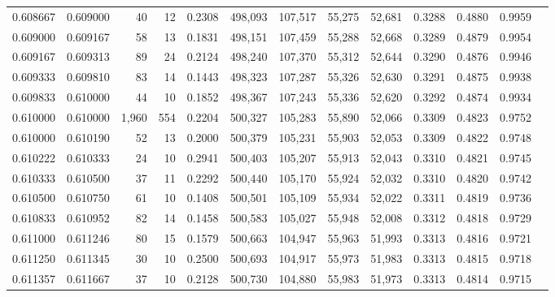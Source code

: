 \begin{tabular}{rrrrrrrrrrrrr}
0.608667 & 0.609000 &    40 &  12 &                                     0.2308 & 498,093 & 107,517 &  55,275 &  52,681 & 0.3288 & 0.4880 & 0.9959 \\
0.609000 & 0.609167 &    58 &  13 &                                     0.1831 & 498,151 & 107,459 &  55,288 &  52,668 & 0.3289 & 0.4879 & 0.9954 \\
0.609167 & 0.609313 &    89 &  24 &                                     0.2124 & 498,240 & 107,370 &  55,312 &  52,644 & 0.3290 & 0.4876 & 0.9946 \\
0.609333 & 0.609810 &    83 &  14 &                                     0.1443 & 498,323 & 107,287 &  55,326 &  52,630 & 0.3291 & 0.4875 & 0.9938 \\
0.609833 & 0.610000 &    44 &  10 &                                     0.1852 & 498,367 & 107,243 &  55,336 &  52,620 & 0.3292 & 0.4874 & 0.9934 \\
0.610000 & 0.610000 & 1,960 & 554 &                                     0.2204 & 500,327 & 105,283 &  55,890 &  52,066 & 0.3309 & 0.4823 & 0.9752 \\
0.610000 & 0.610190 &    52 &  13 &                                     0.2000 & 500,379 & 105,231 &  55,903 &  52,053 & 0.3309 & 0.4822 & 0.9748 \\
0.610222 & 0.610333 &    24 &  10 &                                     0.2941 & 500,403 & 105,207 &  55,913 &  52,043 & 0.3310 & 0.4821 & 0.9745 \\
0.610333 & 0.610500 &    37 &  11 &                                     0.2292 & 500,440 & 105,170 &  55,924 &  52,032 & 0.3310 & 0.4820 & 0.9742 \\
0.610500 & 0.610750 &    61 &  10 &                                     0.1408 & 500,501 & 105,109 &  55,934 &  52,022 & 0.3311 & 0.4819 & 0.9736 \\
0.610833 & 0.610952 &    82 &  14 &                                     0.1458 & 500,583 & 105,027 &  55,948 &  52,008 & 0.3312 & 0.4818 & 0.9729 \\
0.611000 & 0.611246 &    80 &  15 &                                     0.1579 & 500,663 & 104,947 &  55,963 &  51,993 & 0.3313 & 0.4816 & 0.9721 \\
0.611250 & 0.611345 &    30 &  10 &                                     0.2500 & 500,693 & 104,917 &  55,973 &  51,983 & 0.3313 & 0.4815 & 0.9718 \\
0.611357 & 0.611667 &    37 &  10 &                                     0.2128 & 500,730 & 104,880 &  55,983 &  51,973 & 0.3313 & 0.4814 & 0.9715 \\

\end{tabular}
